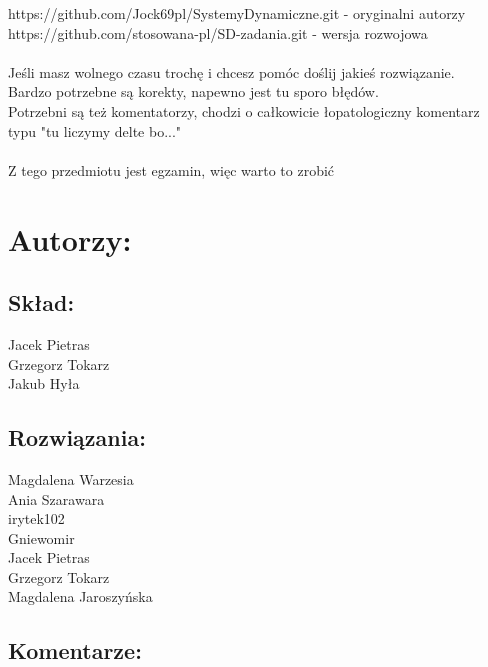 \documentclass[a4paper,10pt]{article}
\begin{document}
\noindent https://github.com/Jock69pl/SystemyDynamiczne.git  - oryginalni autorzy\\
\noindent https://github.com/stosowana-pl/SD-zadania.git - wersja rozwojowa\\
\\
Jeśli masz wolnego czasu trochę i chcesz pomóc doślij jakieś rozwiązanie.\\
Bardzo potrzebne są korekty, napewno jest tu sporo błędów.\\
Potrzebni są też komentatorzy, chodzi o całkowicie łopatologiczny komentarz typu "tu liczymy delte bo..."\\
\\
Z tego przedmiotu jest egzamin, więc warto to zrobić






 

\pagebreak
\section*{Autorzy:}

\subsection*{Skład:} 
Jacek Pietras\\
Grzegorz Tokarz\\
Jakub Hyła

\subsection*{Rozwiązania:} 
Magdalena Warzesia\\
Ania Szarawara\\
irytek102\\
Gniewomir\\
Jacek Pietras\\
Grzegorz Tokarz\\
Magdalena Jaroszyńska

\subsection*{Komentarze:} 
\end{document}
